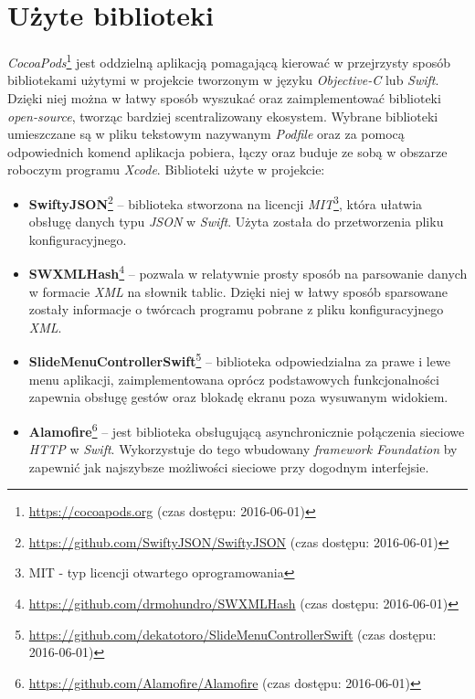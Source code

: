 \documentclass{iiuwb}
\begin{document}
\section{Użyte biblioteki}
\textit{CocoaPods}\footnote{\url{https://cocoapods.org} (czas dostępu: 2016-06-01)} jest oddzielną aplikacją pomagającą kierować w przejrzysty sposób bibliotekami użytymi w projekcie tworzonym w języku \textit{Objective-C} lub \textit{Swift}. Dzięki niej można w łatwy sposób wyszukać oraz zaimplementować biblioteki \textit{open-source}, tworząc bardziej scentralizowany ekosystem. Wybrane biblioteki umieszczane są w pliku tekstowym nazywanym \textit{Podfile} oraz za pomocą odpowiednich komend aplikacja pobiera, łączy oraz buduje ze sobą w obszarze roboczym programu \textit{Xcode}. Biblioteki użyte w projekcie:
\begin{itemize}
\item \textbf{SwiftyJSON}\footnote{\url{https://github.com/SwiftyJSON/SwiftyJSON} (czas dostępu: 2016-06-01)} -- biblioteka stworzona na licencji \textit{MIT}\footnote{MIT - typ licencji otwartego oprogramowania}, która ułatwia obsługę danych typu \textit{JSON} w \textit{Swift}. Użyta została do przetworzenia pliku konfiguracyjnego.
\item \textbf{SWXMLHash}\footnote{\url{https://github.com/drmohundro/SWXMLHash} (czas dostępu: 2016-06-01)} -- pozwala w relatywnie prosty sposób na parsowanie danych w formacie \textit{XML} na słownik tablic. Dzięki niej w łatwy sposób sparsowane zostały informacje o twórcach programu pobrane z pliku konfiguracyjnego \textit{XML}.
\end{itemize}
\newpage
\begin{itemize}
\item \textbf{SlideMenuControllerSwift}\footnote{\url{https://github.com/dekatotoro/SlideMenuControllerSwift} (czas dostępu: 2016-06-01)} -- biblioteka odpowiedzialna za prawe i lewe menu aplikacji, zaimplementowana oprócz podstawowych funkcjonalności zapewnia obsługę gestów oraz blokadę ekranu poza wysuwanym widokiem.
\item \textbf{Alamofire}\footnote{\url{https://github.com/Alamofire/Alamofire} (czas dostępu: 2016-06-01)} -- jest biblioteka obsługującą asynchronicznie połączenia sieciowe \textit{HTTP} w \textit{Swift}. Wykorzystuje do tego wbudowany \textit{framework Foundation} by zapewnić jak najszybsze możliwości sieciowe przy dogodnym interfejsie.
\end{itemize}
\end{document}
